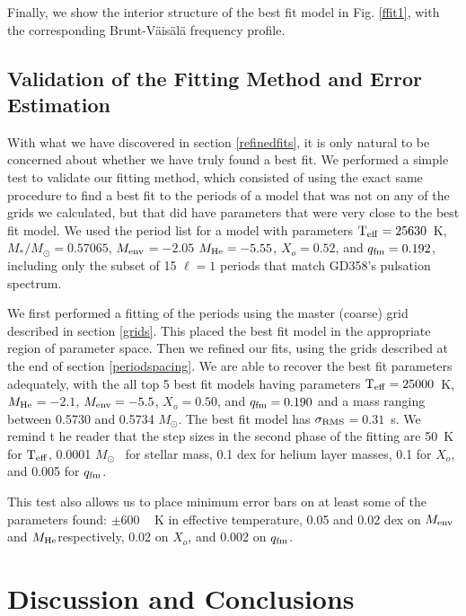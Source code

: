 \documentclass[12pt,preprint]{aastex}
\newcommand{\bvf}{Brunt-V\"ais\"al\"a }
\newcommand{\sigrms}{$\sigma_{\rm RMS}$}
\newcommand{\menv}{$M_{\rm env}$}
\newcommand{\mhe}{$M_{\rm He}$}
\newcommand{\msun}{$M_\odot$}
\begin{document}
Finally, we show the interior structure of the best fit model in Fig. \ref{ffit1}, with the corresponding \bvf frequency profile.

\subsection{Validation of the Fitting Method and Error Estimation}

With what we have discovered in section \ref{refinedfits}, it is only natural to be concerned about whether we have truly 
found a best fit. We performed a simple test to validate our fitting method, which consisted of using the exact same procedure 
to find a best fit to the periods of a model that was not on any of the grids we calculated, but that did have parameters that 
were very close to the best fit model. We used the period list for a model with parameters 
${\rm T_{eff}}=25630$~K, $M_*/M_\odot=0.57065$, \menv $=-2.05$ $M_{\rm He}=-5.55$, $X_o=0.52$, and $q_{\rm fm}=0.192$, 
including only the subset of 15 $\ell=1$ periods that match GD358's pulsation spectrum.

We first performed a fitting of the periods using the master (coarse) grid described in section \ref{grids}. This 
placed the best fit model in the appropriate region of parameter space. Then we refined our fits, using the grids 
described at the end of section \ref{periodspacing}. We are able to recover the best fit parameters adequately, with 
the all top 5 best fit models having parameters 
${\rm T_{eff}}=25000$~K, \mhe $=-2.1$, $M_{\rm env}=-5.5$, $X_o=0.50$, and $q_{\rm fm}=0.190$ and a 
mass ranging between  0.5730 and 0.5734 \msun. The best fit model has \sigrms $=0.31$~s. We remind t
he reader that the step sizes in the second phase of the fitting are 50~K for 
${\rm T_{eff}}$, 0.0001 \msun ~ for stellar mass, 0.1 dex for helium layer masses, 
0.1 for $X_o$, and 0.005 for $q_{\rm fm}$.

This test also allows us to place minimum error bars on at least some of the parameters found: $\pm 600$ ~ K in effective 
temperature, 0.05 and 0.02 dex on \menv and \mhe respectively, 0.02 on $X_o$, and 0.002 on $q_{\rm fm}$.


\section{Discussion and Conclusions}
\label{discussion}
\end{document}
